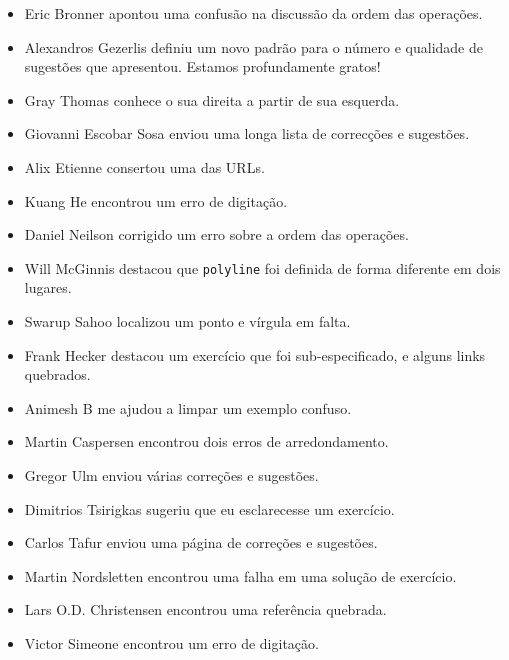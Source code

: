 \documentclass[10pt]{book}
\begin{document}
\begin {itemize}
\item Eric Bronner apontou uma confusão na discussão da
ordem das operações.

\item Alexandros Gezerlis definiu um novo padrão para o número e
qualidade de sugestões que apresentou. Estamos profundamente gratos!

\item Gray Thomas conhece o sua direita a partir de sua esquerda.

\item Giovanni Escobar Sosa enviou uma longa lista de correcções e
sugestões.

\item Alix Etienne consertou uma das URLs.

\item Kuang He encontrou um erro de digitação.

\item Daniel Neilson corrigido um erro sobre a ordem das operações.

\item Will McGinnis destacou que {\tt polyline} foi definida
de forma diferente em dois lugares.

\item Swarup Sahoo localizou um ponto e vírgula em falta.

\item Frank Hecker destacou um exercício que foi sub-especificado, e
alguns links quebrados.

\item Animesh B me ajudou a limpar um exemplo confuso.

\item Martin Caspersen encontrou dois erros de arredondamento.

\item Gregor Ulm enviou várias correções e sugestões.

\item Dimitrios Tsirigkas sugeriu que eu esclarecesse um exercício.

\item Carlos Tafur enviou uma página de correções e sugestões.

\item Martin Nordsletten encontrou uma falha em uma solução de exercício.

\item Lars O.D. Christensen encontrou uma referência quebrada.

\item Victor Simeone encontrou um erro de digitação.


\end{itemize}
\end{document}
